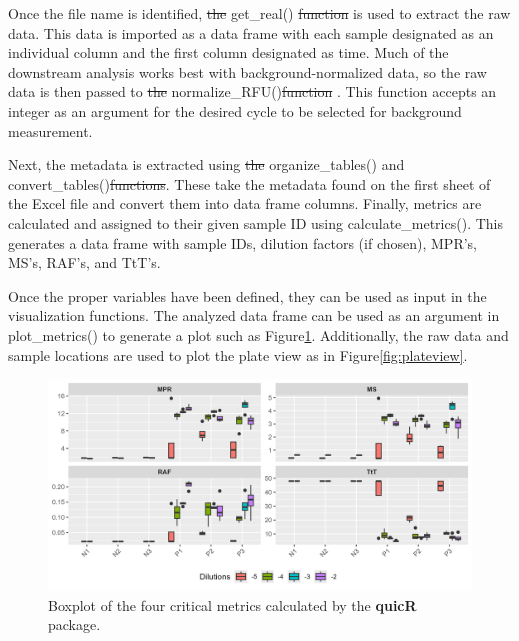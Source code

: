 \documentclass[preprint,12pt,a4paper]{elsarticle}
\providecommand{\DIFaddtex}[1]{{\protect\color{blue}\uwave{#1}}} %
\providecommand{\DIFdeltex}[1]{{\protect\color{red}\sout{#1}}} %
\providecommand{\DIFaddbegin}{} %
\providecommand{\DIFaddend}{} %
\providecommand{\DIFdelbegin}{} %
\providecommand{\DIFdelend}{} %
\providecommand{\DIFadd}[1]{\texorpdfstring{\DIFaddtex{#1}}{#1}} %
\providecommand{\DIFdel}[1]{\texorpdfstring{\DIFdeltex{#1}}{}} %
\begin{document}
            \DIFaddend Once the file name is identified, \DIFdelbegin \DIFdel{the }\DIFdelend get\_real() \DIFdelbegin \DIFdel{function }\DIFdelend is used to extract the raw data. This data is imported as a data frame with each sample designated as an individual column and the first column designated as time. Much of the downstream analysis works best with background-normalized data, so the raw data is then passed to \DIFdelbegin \DIFdel{the }\DIFdelend normalize\_RFU()\DIFdelbegin \DIFdel{function }\DIFdelend \DIFaddbegin \DIFadd{~}\DIFaddend \cite{Rowden2023}. This function accepts an integer as an argument for the desired cycle to be selected for background measurement. 

            Next, the metadata is extracted using \DIFdelbegin \DIFdel{the }\DIFdelend organize\_tables() and convert\_tables()\DIFdelbegin \DIFdel{functions}\DIFdelend . These take the metadata found on the first sheet of the Excel file and convert them into data frame columns. Finally, metrics are calculated and assigned to their given sample ID using calculate\_metrics(). This generates a data frame with sample IDs, dilution factors (if chosen), MPR's, MS's, RAF's, and TtT's.

            Once the proper variables have been defined, they can be used as input in the visualization functions. The analyzed data frame can be used as an argument in plot\_metrics() to generate a plot such as Figure\DIFaddbegin \DIFadd{~}\DIFaddend \ref{fig:boxplot}. Additionally, the raw data and sample locations are used to plot the plate view as in Figure\DIFaddbegin \DIFadd{~}\DIFaddend \ref{fig:plateview}.

            \begin{figure}[ht]
                \centering
                \includegraphics[width=\textwidth]{images/boxplot.png}
                \caption{Boxplot of the four critical metrics calculated by the \textbf{quicR} package.}\label{fig:boxplot}
            \end{figure}
\end{document}

